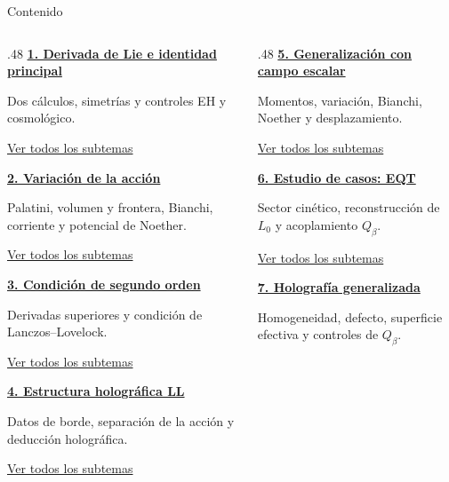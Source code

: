 \begin{frame}[label=nav-content]{Contenido}
\footnotesize
\begin{columns}[T,onlytextwidth]
\begin{column}{.48\textwidth}
\hyperlink{nav-map-1-0}{\textbf{1. Derivada de Lie e identidad principal}}\par
Dos cálculos, simetrías y controles EH y cosmológico.\par
{\scriptsize\hyperlink{nav-index-1-1}{Ver todos los subtemas}}\par\medskip
\hyperlink{nav-map-2-0}{\textbf{2. Variación de la acción}}\par
Palatini, volumen y frontera, Bianchi, corriente y potencial de Noether.\par
{\scriptsize\hyperlink{nav-index-2-1}{Ver todos los subtemas}}\par\medskip
\hyperlink{nav-map-3-0}{\textbf{3. Condición de segundo orden}}\par
Derivadas superiores y condición de Lanczos--Lovelock.\par
{\scriptsize\hyperlink{nav-index-3-1}{Ver todos los subtemas}}\par\medskip
\hyperlink{nav-map-4-0}{\textbf{4. Estructura holográfica LL}}\par
Datos de borde, separación de la acción y deducción holográfica.\par
{\scriptsize\hyperlink{nav-index-4-1}{Ver todos los subtemas}}\par\medskip
\end{column}
\begin{column}{.48\textwidth}
\hyperlink{nav-map-5-0}{\textbf{5. Generalización con campo escalar}}\par
Momentos, variación, Bianchi, Noether y desplazamiento.\par
{\scriptsize\hyperlink{nav-index-5-1}{Ver todos los subtemas}}\par\medskip
\hyperlink{nav-map-6-0}{\textbf{6. Estudio de casos: EQT}}\par
Sector cinético, reconstrucción de $L_0$ y acoplamiento $Q_\beta$.\par
{\scriptsize\hyperlink{nav-index-6-1}{Ver todos los subtemas}}\par\medskip
\hyperlink{nav-map-7-0}{\textbf{7. Holografía generalizada}}\par
Homogeneidad, defecto, superficie efectiva y controles de $Q_\beta$.\par

\end{column}
\end{columns}
\end{frame}
